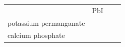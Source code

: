 \begin{enumerate}[noitemsep, label=\textbf{\arabic*}. ]
{\begin{tabular}[t]{|l|l|l|l|}
    
         &
    
    
        \begin{math}\mathrm{PbI}\end{math}%
     \tabularnewline\cline{1-1}\cline{2-2}\cline{3-3}\cline{4-4}
    
    
        potassium permanganate &
    
    
         &
    
    
         &
    
    
     \tabularnewline\cline{1-1}\cline{2-2}\cline{3-3}\cline{4-4}
    
    
        calcium phosphate &
    
    
         &
    

\end{tabular}}
\end{enumerate}
